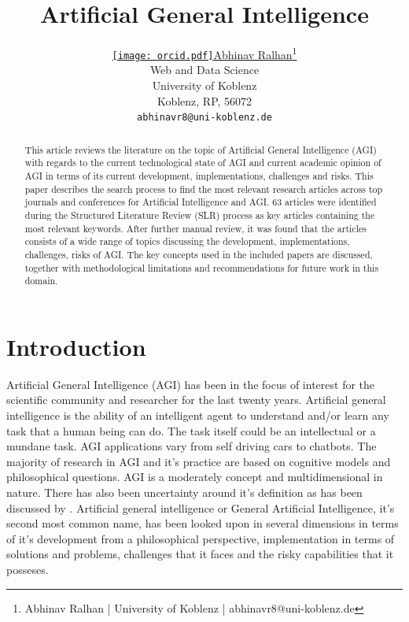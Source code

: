 \documentclass{article}
\title{Artificial General Intelligence} %
\author{ \href{https://scholar.google.co.in/citations?user=e3pXvE8AAAAJ}{\texttt{[image: orcid.pdf]}\hspace{1mm}Abhinav Ralhan}\thanks{Abhinav Ralhan | University of Koblenz | abhinavr8@uni-koblenz.de} \\
	Web and Data Science\\
	University of Koblenz\\
	Koblenz, RP, 56072 \\
	\texttt{abhinavr8@uni-koblenz.de} \\
}
\begin{document}
\maketitle

\begin{abstract}	
    This article reviews the literature on the topic of Artificial General Intelligence (AGI) with regards to the current technological state of AGI and current academic opinion of AGI in terms of its current development, implementations, challenges and risks. This paper describes the search process to find the most relevant research articles across top journals and conferences for Artificial Intelligence and AGI. 63 articles were identified during the Structured Literature Review (SLR) process as key articles containing the most relevant keywords. After further manual review, it was found that the articles consists of a wide range of topics discussing the development, implementations, challenges, risks of AGI. The key concepts used in the included papers are discussed, together with methodological limitations and recommendations for future work in this domain.
\end{abstract}




\section{Introduction}
Artificial General Intelligence (AGI) has been in the focus of interest for the scientific community and researcher for the last twenty years. 
Artificial general intelligence is the ability of an intelligent agent to understand and/or learn any task that a human being can do. The task itself could be an intellectual or a mundane task. AGI applications vary from self driving cars to chatbots. The majority of research in AGI and it's practice are based on cognitive models and philosophical questions. AGI is a moderately concept and multidimensional in nature. There has also been uncertainty around it's definition as has been discussed by \citet{Goertzel2014state}. Artificial general intelligence or General Artificial Intelligence, it's second most common name, has been looked upon in several dimensions in terms of it's development from a philosophical perspective, implementation in terms of solutions and problems, challenges that it faces and the risky capabilities that it posseses.
\end{document}

